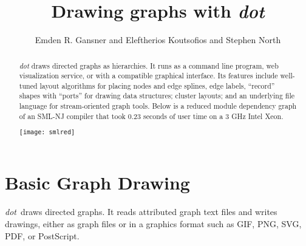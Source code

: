 \documentclass[11pt]{article}
\author{Emden R. Gansner and Eleftherios Koutsofios and Stephen North}
\date{\lastedited}
\def\dot{{\it dot}}
\begin{document}

\title{Drawing graphs with \dot}
\maketitle
\begin{abstract}
\noindent
{\dot} draws directed graphs as hierarchies.
It runs as a command line program, web visualization
service, or with a compatible graphical interface.
Its features include well-tuned layout algorithms
for placing nodes and edge splines, edge labels,
``record'' shapes with ``ports'' for drawing data structures;
cluster layouts; and an underlying file language for
stream-oriented graph tools.
Below is a reduced module dependency graph of an SML-NJ compiler
that took 0.23 seconds of user time on a 3 GHz Intel Xeon.

\vspace*{.25in}
\centerline{
	\texttt{[image: smlred]}
}
\end{abstract}

\newpage
\section{Basic Graph Drawing}
\dot\ draws directed graphs. It reads attributed graph text files and
writes drawings, either as graph files or in a graphics format
such as GIF, PNG, SVG, PDF, or PostScript.
\end{document}

